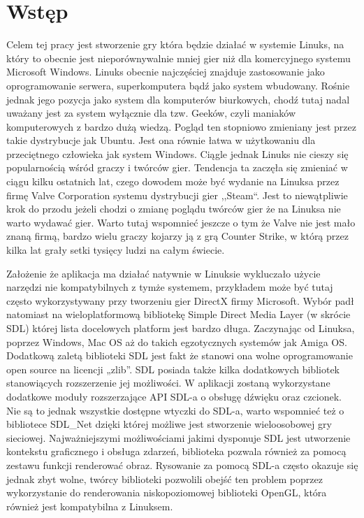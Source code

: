\setcounter{secnumdepth}{-1}
\renewcommand{\chaptername}{}
\chapter{Wstęp} 
\hspace{1cm} Celem tej pracy jest stworzenie gry która będzie działać w systemie Linuks, na który to obecnie jest nieporównywalnie mniej gier niż dla komercyjnego systemu Microsoft Windows. Linuks obecnie najczęściej znajduje zastosowanie jako oprogramowanie serwera, superkomputera bądź jako system wbudowany. Rośnie jednak jego pozycja jako system dla komputerów biurkowych, chodź tutaj nadal uważany jest za system wyłącznie dla tzw. Geeków, czyli maniaków komputerowych z bardzo dużą wiedzą. Pogląd ten stopniowo zmieniany jest przez takie dystrybucje jak Ubuntu. Jest ona równie łatwa w użytkowaniu dla przeciętnego człowieka jak system Windows. Ciągle jednak Linuks nie cieszy się popularnością wśród graczy i twórców gier. Tendencja ta zaczęła się zmieniać w ciągu kilku ostatnich lat, czego dowodem może być wydanie na Linuksa przez firmę Valve Corporation systemu dystrybucji gier ,,Steam``. Jest to niewątpliwie krok do przodu jeżeli chodzi o zmianę poglądu twórców gier że na Linuksa nie warto wydawać gier. Warto tutaj wspomnieć jeszcze o tym że Valve nie jest mało znaną firmą, bardzo wielu graczy kojarzy ją z grą Counter Strike, w którą przez kilka lat grały setki tysięcy ludzi na całym świecie.

Założenie że aplikacja ma działać natywnie w Linuksie wykluczało użycie narzędzi nie kompatybilnych z tymże systemem, przykładem może być tutaj często wykorzystywany przy tworzeniu gier DirectX firmy Microsoft. Wybór padł natomiast na wieloplatformową bibliotekę Simple Direct Media Layer (w skrócie SDL) której lista docelowych platform jest bardzo długa.
Zaczynając od Linuksa, poprzez Windows, Mac OS aż do takich egzotycznych systemów jak Amiga OS. Dodatkową zaletą biblioteki SDL jest fakt że stanowi ona wolne oprogramowanie open source na licencji „zlib”. SDL posiada także kilka dodatkowych bibliotek stanowiących rozszerzenie jej możliwości. W aplikacji zostaną wykorzystane dodatkowe moduły rozszerzające API SDL-a o obsługę
dźwięku oraz czcionek. Nie są to jednak wszystkie dostępne wtyczki do SDL-a, warto wspomnieć też o bibliotece SDL\_Net dzięki której możliwe jest stworzenie wieloosobowej  gry sieciowej. Najważniejszymi możliwościami jakimi dysponuje SDL jest utworzenie kontekstu graficznego i obsługa zdarzeń, biblioteka pozwala również za pomocą zestawu funkcji renderować obraz. Rysowanie za pomocą SDL-a często okazuje się jednak zbyt wolne, twórcy biblioteki pozwolili obejść ten problem poprzez wykorzystanie do renderowania 
niskopoziomowej biblioteki OpenGL, która również jest kompatybilna z Linuksem.

